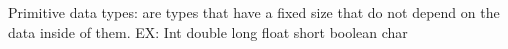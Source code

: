 Primitive data types:
  are types that have a fixed size that do not depend on the data inside of them.
  EX:
    Int
    double
    long
    float
    short
    boolean
    char

